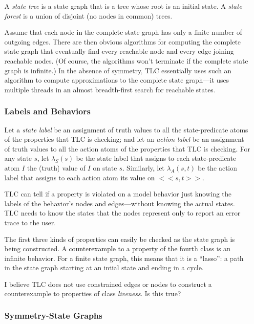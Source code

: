 \documentclass[fleqn,leqno]{article}
\begin{document}
A \emph{state tree} is a state graph that is a tree whose root is an
initial state.  A \emph{state forest} is a union of disjoint (no nodes
in common) trees.

Assume that each node in the complete state graph has only a finite
number of outgoing edges.  There are then obvious algorithms for
computing the complete state graph that eventually find every
reachable node and every edge joining reachable nodes.  (Of course,
the algorithms won't terminate if the complete state graph is
infinite.)  In the absence of symmetry, TLC essentially uses such an
algorithm to compute approximations to the complete state graph---it
uses multiple threads in an almost breadth-first search for reachable
states.

\subsubsection{Labels and Behaviors}

Let a \emph{state label} be an assignment of truth values to all the
state-predicate atoms of the properties that TLC is checking; and let
an \emph{action label} be an assignment of truth values to all the
action atoms of the properties that TLC is checking.  For any state
$s$, let $\lambda_{S}(s)$ be the state label that assigns to each
state-predicate atom $I$ the (truth) value of $I$ on state $s$.
Similarly, let $\lambda_{A}(s,t)$ be the action label that assigns to
each action atom its value on $<<s, t>>$.

TLC can tell if a property is violated on a model behavior just
knowing the labels of the behavior's nodes and edges---without knowing
the actual states.  TLC needs to know the states that the nodes
represent only to report an error trace to the user.

The first three kinds of properties can easily be checked as the state
graph is being constructed.  A counterexample to a property of the
fourth class is an infinite behavior.  For a finite state graph, this
means that it is a ``lasso'': a path in the state graph starting at an
intial state and ending in a cycle.
\begin{question}
I believe TLC does not use constrained edges or nodes to construct
a counterexample to properties of class \emph{liveness}.  Is this
true?
\end{question}


\subsubsection{Symmetry-State Graphs}
\end{document}
